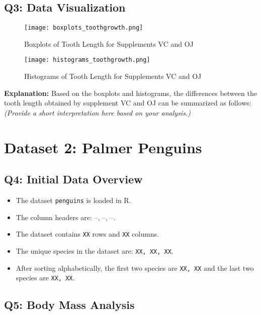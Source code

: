 \documentclass{article}
\begin{document}
\subsection{Q3: Data Visualization}

\begin{figure}[H]
    \centering
    \texttt{[image: boxplots\_toothgrowth.png]} %
    \caption{Boxplots of Tooth Length for Supplements VC and OJ}
    \label{fig:boxplots_toothgrowth}
\end{figure}

\begin{figure}[H]
    \centering
    \texttt{[image: histograms\_toothgrowth.png]} %
    \caption{Histograms of Tooth Length for Supplements VC and OJ}
    \label{fig:histograms_toothgrowth}
\end{figure}

\textbf{Explanation:} Based on the boxplots and histograms, the differences between the tooth length obtained by supplement VC and OJ can be summarized as follows: \textit{(Provide a short interpretation here based on your analysis.)}

\section{Dataset 2: Palmer Penguins}

\subsection{Q4: Initial Data Overview}
\begin{itemize}
    \item The dataset \texttt{penguins} is loaded in R.
    \item The column headers are: \---, \---, \---.
    \item The dataset contains \texttt{XX} rows and \texttt{XX} columns.
    \item The unique species in the dataset are: \texttt{XX, XX, XX}.
    \item After sorting alphabetically, the first two species are \texttt{XX, XX} and the last two species are \texttt{XX, XX}.
\end{itemize}

\subsection{Q5: Body Mass Analysis}
\end{document}

